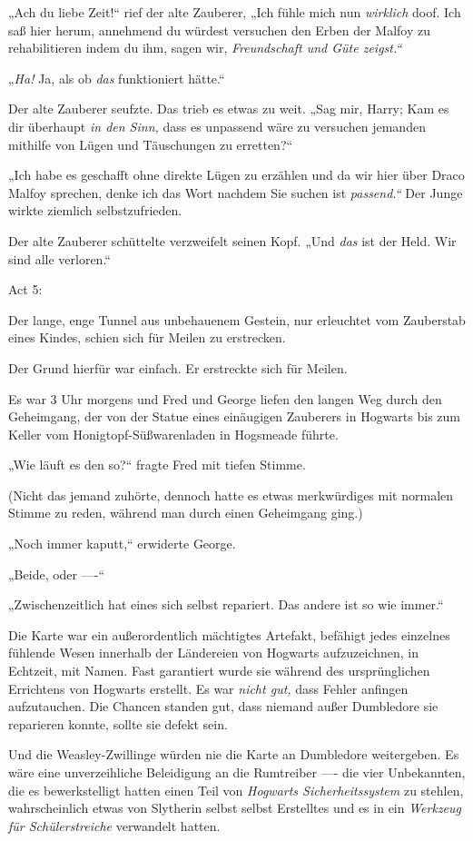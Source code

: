 {„Ach du liebe Zeit!“ rief der alte Zauberer, „Ich fühle mich nun \emph{wirklich} doof. Ich saß hier herum, annehmend du würdest versuchen den Erben der Malfoy zu rehabilitieren indem du ihm, sagen wir, \emph{Freundschaft und Güte zeigst.“}

„\emph{Ha!} Ja, als ob \emph{das} funktioniert hätte.“

Der alte Zauberer seufzte. Das trieb es etwas zu weit. „Sag mir, Harry; Kam es dir überhaupt \emph{in den Sinn,} dass es unpassend wäre zu versuchen jemanden mithilfe von Lügen und Täuschungen zu erretten?“

„Ich habe es geschafft ohne direkte Lügen zu erzählen und da wir hier über Draco Malfoy sprechen, denke ich das Wort nachdem Sie suchen ist \emph{passend.“} Der Junge wirkte ziemlich selbstzufrieden.

Der alte Zauberer schüttelte verzweifelt seinen Kopf. „Und \emph{das} ist der Held. Wir sind alle verloren.“

Act 5:

Der lange, enge Tunnel aus unbehauenem Gestein, nur erleuchtet vom Zauberstab eines Kindes, schien sich für Meilen zu erstrecken.

Der Grund hierfür war einfach. Er erstreckte sich für Meilen.

Es war 3 Uhr morgens und Fred und George liefen den langen Weg durch den Geheimgang, der von der Statue eines einäugigen Zauberers in Hogwarts bis zum Keller vom Honigtopf-Süßwarenladen in Hogsmeade führte.

„Wie läuft es den so?“ fragte Fred mit tiefen Stimme.

(Nicht das jemand zuhörte, dennoch hatte es etwas merkwürdiges mit normalen Stimme zu reden, während man durch einen Geheimgang ging.)

„Noch immer kaputt,“ erwiderte George.

„Beide, oder ----“

„Zwischenzeitlich hat eines sich selbst repariert. Das andere ist so wie immer.“

Die Karte war ein außerordentlich mächtigtes Artefakt, befähigt jedes einzelnes fühlende Wesen innerhalb der Ländereien von Hogwarts aufzuzeichnen, in Echtzeit, mit Namen. Fast garantiert wurde sie während des ursprünglichen Errichtens von Hogwarts erstellt. Es war \emph{nicht gut,} dass Fehler anfingen aufzutauchen. Die Chancen standen gut, dass niemand außer Dumbledore sie reparieren konnte, sollte sie defekt sein.

Und die Weasley-Zwillinge würden nie die Karte an Dumbledore weitergeben. Es wäre eine unverzeihliche Beleidigung an die Rumtreiber ---- die vier Unbekannten, die es bewerkstelligt hatten einen Teil von \emph{Hogwarts Sicherheitssystem} zu stehlen, wahrscheinlich etwas von Slytherin selbst selbst Erstelltes und es in ein \emph{Werkzeug für Schülerstreiche} verwandelt hatten.

}
